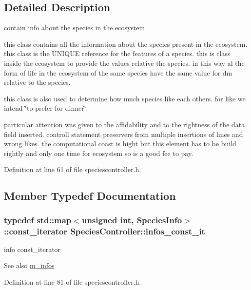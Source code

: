 \subsection{Detailed Description}
contain info about the species in the ecosystem 

this class contains all the information about the species present in the ecosystem. this class is the UNIQUE reference for the features of a species. this is class inside the ecosystem to provide the values relative the species. in this way al the form of life in the ecosystem of the same species have the same value for dm relative to the species.

this class is also used to determine how much species like each others. for like we intend \char`\"{}to prefer for dinner\char`\"{}.

particular attention was given to the affidability and to the rightness of the data field inserted. controll statement preservers from multiple insertions of lines and wrong likes. the computational coast is hight but this element has to be build rightly and only one time for ecosystem so is a good fee to pay. 

Definition at line 61 of file speciescontroller.h.



\subsection{Member Typedef Documentation}
\hypertarget{classSpeciesController_a0dc92662511aca888d67516eb87b6260}{
\subsubsection[{infos\_\-const\_\-it}]{\setlength{\rightskip}{0pt plus 5cm}typedef std::map$<$unsigned int, {\bf SpeciesInfo}$>$::const\_\-iterator {\bf SpeciesController::infos\_\-const\_\-it}}}
\label{classSpeciesController_a0dc92662511aca888d67516eb87b6260}


info const\_\-iterator 

\begin{DoxySeeAlso}{See also}
\hyperlink{classSpeciesController_a4e439ccd41d6143680b7a89bd985c8ad}{m\_\-infos} 
\end{DoxySeeAlso}


Definition at line 81 of file speciescontroller.h.

